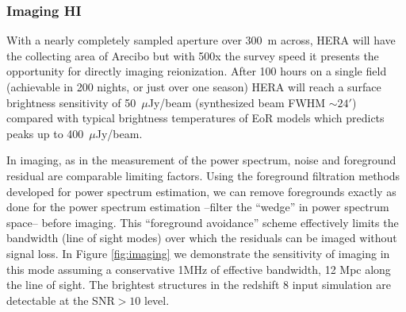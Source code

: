 \documentclass[preprint]{aastex}
\begin{document}
\subsubsection{Imaging HI}
With a nearly completely sampled aperture over 300~m across, HERA will have the collecting area of Arecibo but 
with 500x the survey speed it presents the opportunity for directly imaging reionization.  After 100 hours on a 
single field (achievable in 200 nights, or just over one season) HERA will reach a surface brightness sensitivity 
of 50~$\mu$Jy/beam (synthesized beam FWHM $\sim 24'$) compared with typical brightness temperatures of EoR models 
which predicts peaks up to 400~$\mu$Jy/beam.

In imaging, as in the measurement of the power spectrum, noise and foreground residual are comparable limiting 
factors. Using the foreground filtration methods developed for power spectrum estimation, we can remove 
foregrounds exactly as done for the power spectrum estimation --filter the ``wedge'' in power spectrum 
space-- before imaging.  This ``foreground avoidance'' scheme effectively limits the bandwidth (line of sight 
modes) over which the residuals can be imaged without signal loss.  In Figure \ref{fig:imaging} we demonstrate the 
sensitivity of imaging in this mode assuming a conservative 1MHz of effective bandwidth, 12 Mpc along the line of 
sight.  The brightest structures in the redshift 8 input simulation are detectable at the SNR$>10$ level.

\end{document}
